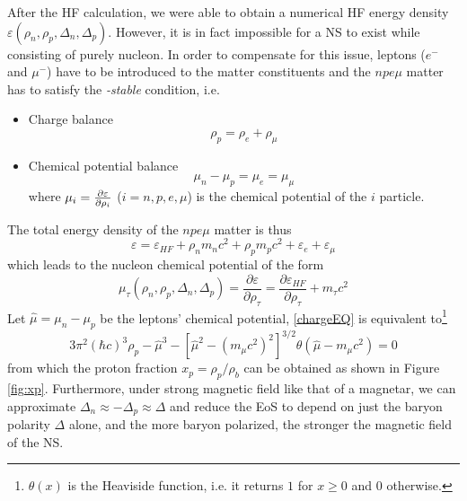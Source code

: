 After the \gls{HF} calculation, we were able to obtain a numerical \gls{HF} energy density $\varepsilon(\rho_n,\rho_p,\Delta_n,\Delta_p)$. However, it is in fact impossible for a \gls{NS} to exist while consisting of purely nucleon. In order to compensate for this issue, leptons ($e^-$ and $\mu^-$) have to be introduced to the matter constituents and the $npe\mu$ matter has to satisfy the \emph{\textbeta-stable} condition, i.e.
\begin{itemize}
        \item Charge balance
                \begin{equation}
                        \rho_p = \rho_e + \rho_\mu
                        \label{chargeEQ}
                \end{equation}
        \item Chemical potential balance
                \begin{equation}
                        \mu_n - \mu_p = \mu_e = \mu_\mu
                \end{equation}
                where $\mu_i = \pdv{\varepsilon}{\rho_i}$ ($i=n,p,e,\mu$) is the chemical potential of the $i$ particle.
\end{itemize}
The total energy density of the $npe\mu$ matter is thus
\begin{equation}
        \varepsilon = \varepsilon_{HF} + \rho_n m_n c^2 + \rho_p m_p c^2 + \varepsilon_e + \varepsilon_\mu 
\end{equation}
which leads to the nucleon chemical potential of the form
\begin{equation}
        \mu_\tau (\rho_n,\rho_p,\Delta_n,\Delta_p) = \frac{\partial \varepsilon}{\partial \rho_\tau}  = \frac{\partial \varepsilon_{HF}}{\partial \rho_\tau} + m_\tau c^2
\end{equation}
Let $\hat{\mu} = \mu_n - \mu_p$ be the leptons' chemical potential, \eqref{chargeEQ} is equivalent to\footnote{$\theta(x)$ is the Heaviside function, i.e. it returns $1$ for $x\geq 0$ and $0$ otherwise.}
\begin{equation}
        3\pi^2 (\hbar c)^3 \rho_p - \hat{\mu}^3 - \left[ \hat{\mu}^2 - (m_\mu c^2)^2 \right]^{3/2} \theta(\hat{\mu} - m_\mu c^2) = 0
\end{equation}
from which the proton fraction $x_p = \rho_p/\rho_b$ can be obtained as shown in Figure \ref{fig:xp}. Furthermore, under strong magnetic field like that of a magnetar, we can approximate $\Delta_n \approx -\Delta_p \approx \Delta$ and reduce the \gls{EoS} to depend on just the baryon polarity $\Delta$ alone, and the more baryon polarized, the stronger the magnetic field of the \gls{NS}.\par
